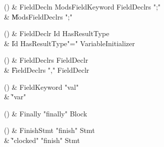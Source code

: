 \begin{bbgrammarappendix}

() & FieldDecln \label{prod:FieldDecln}  \: Mods\opt FieldKeyword FieldDeclrs \xcd";"  \\

 &    \| Mods\opt FieldDeclrs \xcd";" \\

\end{bbgrammarappendix}

\begin{bbgrammarappendix}

() & FieldDeclr \label{prod:FieldDeclr}  \: Id HasResultType  \\

 &    \| Id HasResultType\opt \xcd"=" VariableInitializer \\

\end{bbgrammarappendix}

\begin{bbgrammarappendix}

() & FieldDeclrs \label{prod:FieldDeclrs}  \: FieldDeclr  \\

 &    \| FieldDeclrs \xcd"," FieldDeclr \\

\end{bbgrammarappendix}

\begin{bbgrammarappendix}

() & FieldKeyword \label{prod:FieldKeyword}  \: \xcd"val"  \\

 &    \| \xcd"var" \\

\end{bbgrammarappendix}

\begin{bbgrammarappendix}

() & Finally \label{prod:Finally}  \: \xcd"finally" Block  \\


\end{bbgrammarappendix}

\begin{bbgrammarappendix}

() & FinishStmt \label{prod:FinishStmt}  \: \xcd"finish" Stmt  \\

 &    \| \xcd"clocked" \xcd"finish" Stmt \\

\end{bbgrammarappendix}

